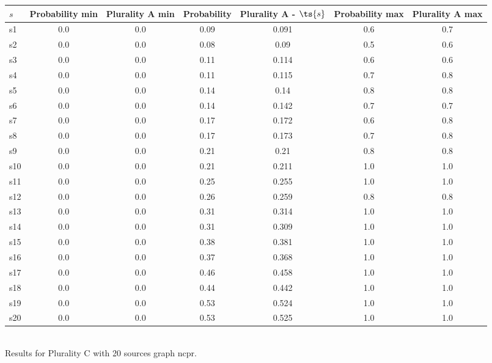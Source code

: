 \documentclass{article}
\begin{document}
\noindent\begin{tabular}{|l|c|c|c|c|c|c|}
\hline
$s$& Probability min & Plurality A min & Probability & Plurality A - $\ts{s}$ & Probability max & Plurality A max\\
\hline
s1 &0.0 & 0.0 & 0.09 & 0.091 & 0.6 & 0.7\\
\hline
s2 &0.0 & 0.0 & 0.08 & 0.09 & 0.5 & 0.6\\
\hline
s3 &0.0 & 0.0 & 0.11 & 0.114 & 0.6 & 0.6\\
\hline
s4 &0.0 & 0.0 & 0.11 & 0.115 & 0.7 & 0.8\\
\hline
s5 &0.0 & 0.0 & 0.14 & 0.14 & 0.8 & 0.8\\
\hline
s6 &0.0 & 0.0 & 0.14 & 0.142 & 0.7 & 0.7\\
\hline
s7 &0.0 & 0.0 & 0.17 & 0.172 & 0.6 & 0.8\\
\hline
s8 &0.0 & 0.0 & 0.17 & 0.173 & 0.7 & 0.8\\
\hline
s9 &0.0 & 0.0 & 0.21 & 0.21 & 0.8 & 0.8\\
\hline
s10 &0.0 & 0.0 & 0.21 & 0.211 & 1.0 & 1.0\\
\hline
s11 &0.0 & 0.0 & 0.25 & 0.255 & 1.0 & 1.0\\
\hline
s12 &0.0 & 0.0 & 0.26 & 0.259 & 0.8 & 0.8\\
\hline
s13 &0.0 & 0.0 & 0.31 & 0.314 & 1.0 & 1.0\\
\hline
s14 &0.0 & 0.0 & 0.31 & 0.309 & 1.0 & 1.0\\
\hline
s15 &0.0 & 0.0 & 0.38 & 0.381 & 1.0 & 1.0\\
\hline
s16 &0.0 & 0.0 & 0.37 & 0.368 & 1.0 & 1.0\\
\hline
s17 &0.0 & 0.0 & 0.46 & 0.458 & 1.0 & 1.0\\
\hline
s18 &0.0 & 0.0 & 0.44 & 0.442 & 1.0 & 1.0\\
\hline
s19 &0.0 & 0.0 & 0.53 & 0.524 & 1.0 & 1.0\\
\hline
s20 &0.0 & 0.0 & 0.53 & 0.525 & 1.0 & 1.0\\
\hline
\end{tabular}\\

\noindent Results for Plurality C with 20 sources graph ncpr.
\end{document}
